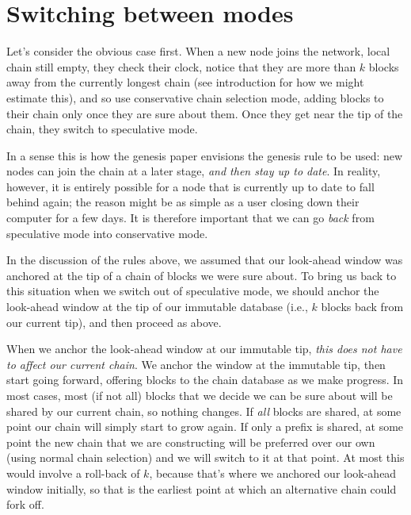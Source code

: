 \section{Switching between modes}
\label{genesis:switching-modes}

Let's consider the obvious case first. When a new node joins the network,
local chain still empty, they check their clock, notice that they are more
than $k$ blocks away from the currently longest chain (see introduction for
how we might estimate this), and so use conservative chain selection mode,
adding blocks to their chain only once they are sure about them. Once they
get near the tip of the chain, they switch to speculative mode.

In a sense this is how the genesis paper envisions the genesis rule to be used:
new nodes can join the chain at a later stage, \emph{and then stay up to date}.
In reality, however, it is entirely possible for a node that is currently up
to date to fall behind again; the reason might be as simple as a user closing
down their computer for a few days. It is therefore important that we can go
\emph{back} from speculative mode into conservative mode.

In the discussion of the rules above, we assumed that our look-ahead window
was anchored at the tip of a chain of blocks we were sure about. To bring us
back to this situation when we switch out of speculative mode, we should
anchor the look-ahead window at the tip of our immutable database (i.e.,
$k$ blocks back from our current tip), and then proceed as above.

When we anchor the look-ahead window at our immutable tip, \emph{this does not
have to affect our current chain}. We anchor the window at the immutable tip,
then start going forward, offering blocks to the chain database as we make
progress. In most cases, most (if not all) blocks that we decide we can be sure
about will be shared by our current chain, so nothing changes. If \emph{all}
blocks are shared, at some point our chain will simply start to grow again. If
only a prefix is shared, at some point the new chain that we are constructing
will be preferred over our own (using normal chain selection) and we will switch
to it at that point. At most this would involve a roll-back of $k$, because
that's where we anchored our look-ahead window initially, so that is the
earliest point at which an alternative chain could fork off.








